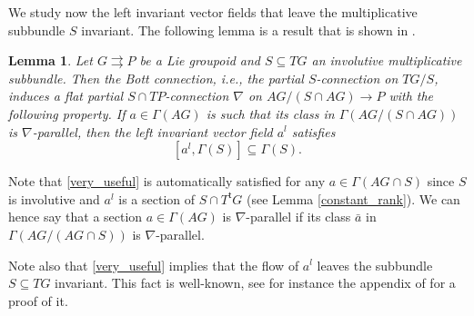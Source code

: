 \documentclass{amsart}
\newtheorem{lemma}[theorem]{Lemma}
\theoremstyle{definition}
\begin{document}
We study now the left invariant vector fields that leave the multiplicative subbundle $S$ invariant.
The following lemma is a result that is shown in \cite{JoOr11}.
\begin{lemma}\label{lem_work_in_progr}
Let $G{{\rightrightarrows}} P$ be a Lie groupoid and $S\subseteq TG$ 
an involutive multiplicative subbundle. Then 
the Bott connection, i.e., the partial $S$-connection on $TG/S$,
induces a  flat partial $S\cap TP$-connection $\nabla$ on $AG/(S\cap AG)\to P$
with the following property. If $a\in  \Gamma(AG)$
is such that its class in $\Gamma\left(AG/(S\cap AG)\right)$
is $\nabla$-parallel, then the left invariant vector field $a^l$ satisfies
\begin{equation}\label{very_useful}
 \left[a^l,\Gamma(S)\right]\subseteq \Gamma(S).
\end{equation}
\end{lemma}
Note that \eqref{very_useful} is automatically satisfied for any 
$a\in\Gamma(AG\cap S)$ since $S$ is involutive and 
$a^l$ is a section of $S\cap T^{{\mathsf{t}}} G$ (see Lemma \ref{constant_rank}).
We can hence say that a section $a\in\Gamma(AG)$ is $\nabla$-parallel
if its class $\bar{a}$ in $\Gamma(AG/(AG\cap S))$
is $\nabla$-parallel.

Note also that \eqref{very_useful} implies that the flow of $a^l$ leaves the subbundle
$S\subseteq TG$ invariant. This fact is well-known, see for instance the appendix of \cite{JoOr11} for a proof of it.
\end{document}
